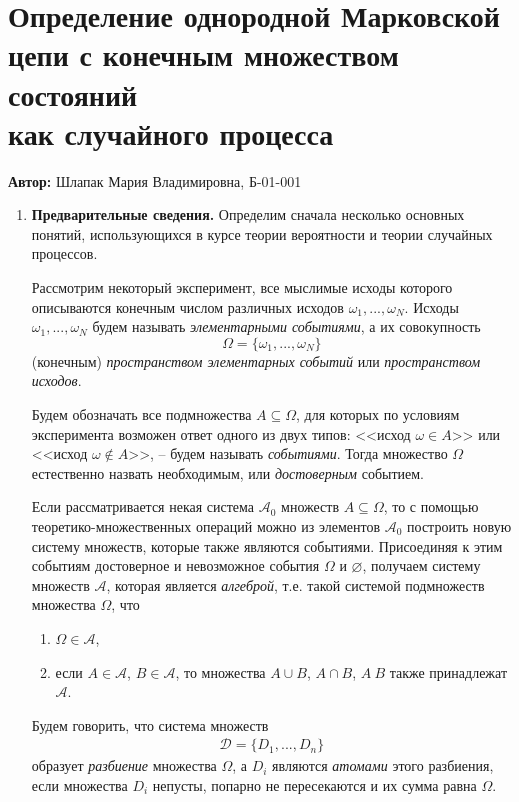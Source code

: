 
 \section{Определение однородной Марковской цепи с конечным множеством состояний\\ как случайного процесса}
 
 \textbf{Автор:} Шлапак Мария Владимировна, Б-01-001
 
\begin{enumerate}
\item \textbf{Предварительные сведения.} Определим сначала несколько основных понятий, использующихся в курсе теории вероятности и теории случайных процессов.

Рассмотрим некоторый эксперимент, все мыслимые исходы которого описываются конечным числом различных исходов $\omega_1, ..., \omega_N$. Исходы $\omega_1, ..., \omega_N$ будем называть \textit{элементарными событиями}, а их совокупность
\begin{equation*}
\Omega = \{\omega_1, ..., \omega_N\}
\end{equation*}
(конечным) \textit{пространством элементарных событий} или \textit{пространством исходов}.

Будем обозначать все подмножества $A \subseteq \Omega$, для которых по условиям эксперимента возможен ответ одного из двух типов: <<исход $\omega \in A$>> или <<исход $\omega \notin A$>>, -- будем называть \textit{событиями}. Тогда множество $\Omega$ естественно назвать необходимым, или \textit{достоверным} событием. 

Если рассматривается некая система $\mathcal{A_{0}}$ множеств $A \subseteq \Omega$, то с помощью теоретико-множественных операций можно из элементов $\mathcal{A_0}$ построить новую систему множеств, которые также являются событиями. Присоединяя к этим событиям достоверное и невозможное события $\Omega$ и $\varnothing$, получаем систему множеств $\mathcal{A}$, которая является \textit{алгеброй}, т.е. такой системой подмножеств множества $\Omega$, что
\begin{enumerate}
\item $\Omega \in \mathcal{A}$,
\item если $A \in \mathcal{A}$, $B \in \mathcal{A}$, то множества $A\cup B$, $A \cap B$, $A \ B$ также принадлежат $\mathcal{A}$. 
\end{enumerate}

Будем говорить, что система множеств 
\begin{align*}
\mathcal{D} = \{D_1, ... , D_n\}
\end{align*}
образует \textit{разбиение} множества $\Omega$, а $D_i$ являются \textit{атомами} этого разбиения, если множества $D_i$ непусты, попарно не пересекаются и их сумма равна $\Omega$. 


\end{enumerate}

